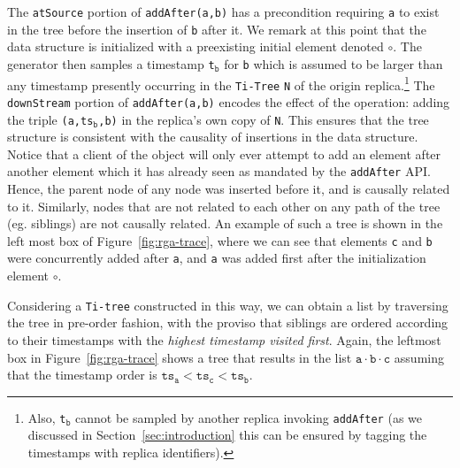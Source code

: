 The \lstinline|atSource| portion of \lstinline|addAfter(a,b)| has
a precondition requiring \lstinline|a| to exist in the tree before the
insertion of \lstinline|b| after it.
%
We remark at this point that the data structure is initialized with a
preexisting initial element denoted $\circ$.
%
The generator then samples a timestamp \lstinline|t|$_{\mathtt{b}}$
for \lstinline|b| which is assumed to be larger than any
timestamp presently occurring in the \lstinline|Ti-Tree|
\lstinline|N| of the origin replica.\footnote{Also, \lstinline|t|$_{\mathtt{b}}$ cannot 
be sampled by another replica invoking \lstinline|addAfter| (as we discussed
in Section~\ref{sec:introduction} this can be ensured by tagging the timestamps with replica identifiers).}
%
The \lstinline|downStream| portion of \lstinline|addAfter(a,b)|
encodes the effect of the operation: adding the triple
\lstinline|(a,ts|$_{\mathtt{b}}$\lstinline|,b)| in the replica's own
copy of \lstinline|N|.
%
This ensures that the tree structure is consistent with the causality
of insertions in the data structure.
%
Notice that a client of the object will only ever attempt to add an
element after another element which it has already seen as mandated by
the \lstinline|addAfter| API.
%
Hence, the parent node of any node was inserted before it, and is
causally related to it.
%
Similarly, nodes that are not related to each other on any path of
the tree (eg. siblings) are not causally related.
%
An example of such a tree is shown in the left most box
of Figure~\ref{fig:rga-trace}, where we can see that
elements \lstinline|c| and \lstinline|b| were concurrently added after
\lstinline|a|, and \lstinline|a| was added first after the
initialization element $\circ$.

Considering a \lstinline|Ti-tree| constructed in this way, we can
obtain a list by traversing the tree in pre-order fashion, with the
proviso that siblings are ordered according to their timestamps with
the \emph{highest timestamp visited first}.
%
Again, the leftmost box in Figure~\ref{fig:rga-trace} shows a tree that
results in the list $\mathtt{a \cdot b \cdot c}$ assuming that the
timestamp order is $\mathtt{ts_a < ts_c < ts_b}$.

